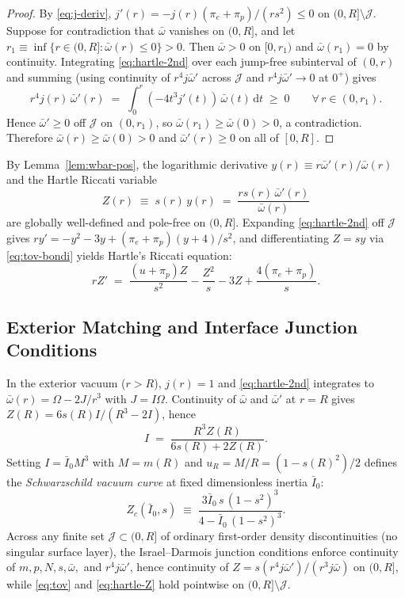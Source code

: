 \documentclass[11pt]{article}
\theoremstyle{plain}
\theoremstyle{definition}
\newcommand{\dd}{\mathrm{d}}
\newcommand{\Ibar}{\bar{I}}
\newcommand{\wbar}{\bar{\omega}}
\begin{document}
\begin{proof}
By \eqref{eq:j-deriv}, $j'(r) = -j(r)(\pi_e + \pi_p)/(r s^2) \le 0$ on $(0, R] \setminus \mathcal{J}$. Suppose for contradiction that $\wbar$ vanishes on $(0, R]$, and let $r_1 \equiv \inf\{r \in (0, R] : \wbar(r) \le 0\} > 0$. Then $\wbar > 0$ on $[0, r_1)$ and $\wbar(r_1) = 0$ by continuity. Integrating \eqref{eq:hartle-2nd} over each jump-free subinterval of $(0, r)$ and summing (using continuity of $r^4 j \wbar'$ across $\mathcal{J}$ and $r^4 j \wbar' \to 0$ at $0^+$) gives
\[
  r^4 j(r)\,\wbar'(r) \;=\; \int_0^r (-4 t^3 j'(t))\,\wbar(t)\,\dd t \;\ge\; 0 \qquad \forall\, r \in (0, r_1).
\]
Hence $\wbar' \ge 0$ off $\mathcal{J}$ on $(0, r_1)$, so $\wbar(r_1) \ge \wbar(0) > 0$, a contradiction. Therefore $\wbar(r) \ge \wbar(0) > 0$ and $\wbar'(r) \ge 0$ on all of $[0, R]$.
\end{proof}

By Lemma~\ref{lem:wbar-pos}, the logarithmic derivative $y(r) \equiv r \wbar'(r)/\wbar(r)$ and the Hartle Riccati variable
\begin{equation}
  Z(r) \;\equiv\; s(r)\,y(r) \;=\; \frac{r s(r)\,\wbar'(r)}{\wbar(r)}
  \label{eq:Z-def}
\end{equation}
are globally well-defined and pole-free on $(0, R]$. Expanding \eqref{eq:hartle-2nd} off $\mathcal{J}$ gives $r y' = -y^2 - 3y + (\pi_e + \pi_p)(y+4)/s^2$, and differentiating $Z = s y$ via \eqref{eq:tov-bondi} yields Hartle's Riccati equation:
\begin{equation}
  r Z' \;=\; \frac{(u + \pi_p) Z}{s^2} - \frac{Z^2}{s} - 3 Z + \frac{4(\pi_e + \pi_p)}{s}.
  \label{eq:hartle-Z}
\end{equation}

\subsection{Exterior Matching and Interface Junction Conditions}

In the exterior vacuum ($r > R$), $j(r) = 1$ and \eqref{eq:hartle-2nd} integrates to $\wbar(r) = \Omega - 2 J/r^3$ with $J = I \Omega$. Continuity of $\wbar$ and $\wbar'$ at $r = R$ gives $Z(R) = 6 s(R) I / (R^3 - 2 I)$, hence
\begin{equation}
  I \;=\; \frac{R^3 Z(R)}{6 s(R) + 2 Z(R)}.
  \label{eq:I-formula}
\end{equation}
Setting $I = \Ibar_0 M^3$ with $M = m(R)$ and $u_R = M/R = (1 - s(R)^2)/2$ defines the \emph{Schwarzschild vacuum curve} at fixed dimensionless inertia $\Ibar_0$:
\begin{equation}
  Z_c(\Ibar_0, s) \;\equiv\; \frac{3 \Ibar_0\,s\,(1 - s^2)^3}{4 - \Ibar_0\,(1 - s^2)^3}.
  \label{eq:Zc-def}
\end{equation}
Across any finite set $\mathcal{J} \subset (0, R]$ of ordinary first-order density discontinuities (no singular surface layer), the Israel--Darmois junction conditions enforce continuity of $m, p, N, s, \wbar,$ and $r^4 j \wbar'$, hence continuity of $Z = s(r^4 j \wbar')/(r^3 j \wbar)$ on $(0, R]$, while \eqref{eq:tov} and \eqref{eq:hartle-Z} hold pointwise on $(0, R] \setminus \mathcal{J}$.
\end{document}
